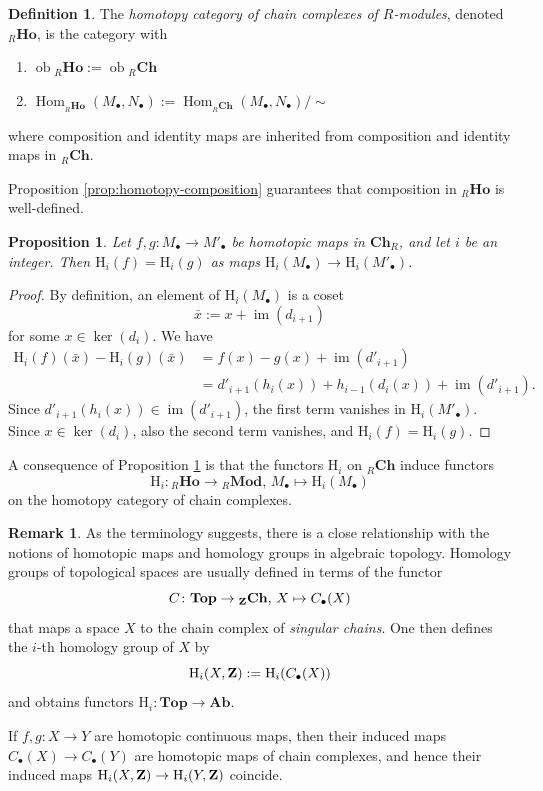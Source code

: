\documentclass[11pt]{amsbook}
\DeclareMathOperator\Hom{Hom}
\DeclareMathOperator\Mod{{\bf{Mod}}}
\DeclareMathOperator\im{im}
\DeclareMathOperator\ob{ob}
\def\rH{{\mathrm H}} \def\rK{{\mathrm K}} \def\rR{{\mathrm R}}
\def\Ab{\mathbf{Ab}}
\def\Top{\mathbf{Top}}
\def\Mod{\mathbf{Mod}}
\def\Ch{\mathbf{Ch}}
\def\Ho{\mathbf{Ho}}
\theoremstyle{plain}
\newtheorem{proposition}[theorem]{Proposition}
\theoremstyle{definition}
\newtheorem{definition}[theorem]{Definition}
\newtheorem{remark}[theorem]{Remark}
\begin{document}
\begin{definition}
The \emph{homotopy category of chain complexes of $R$-modules}, denoted ${}_R\Ho$,  is the
category with
\begin{enumerate}
\item $\ob {}_R\Ho := \ob {}_R\Ch$
\item $\Hom_{{}_R\Ho}(M_\bullet,N_\bullet) := \Hom_{{}_R\Ch}(M_\bullet, N_\bullet) / \sim$
\end{enumerate}
where composition and identity maps are inherited from composition and identity maps in ${}_R\Ch$.
\end{definition}

Proposition  \ref{prop:homotopy-composition} guarantees that composition in ${}_R\Ho$ is well-defined. 

\begin{proposition}\label{prop:homotopic-maps-agree-on-homology}
Let $f,g\colon M_\bullet \to M'_\bullet$ be homotopic maps in $\Ch_R$, and let $i$ be an integer. Then $\rH_i(f)=\rH_i(g)$ as maps $\rH_i(M_\bullet) \to \rH_i(M'_\bullet)$.
\end{proposition}

\begin{proof}
By definition, an element of $\rH_i(M_\bullet)$ is a coset
\[
	 \bar{x} := x + \im(d_{i+1})
\]
for some  $x\in \ker(d_i)$. We have
\begin{align*}
	\rH_i(f)(\bar{x}) - \rH_i(g)(\bar{x}) &=  f(x) - g(x) + \im (d'_{i+1})  \\
	&= d'_{i+1}(h_i(x)) + h_{i-1}(d_i(x))  +  \im (d'_{i+1}).
\end{align*}
Since $d'_{i+1}(h_i(x))  \in \im(d'_{i+1})$, the first term vanishes in $\rH_i(M'_\bullet)$. Since $x\in \ker(d_i)$, also the second term vanishes, and  $\rH_i(f)=\rH_i(g)$.
\end{proof}

A consequence of Proposition \ref{prop:homotopic-maps-agree-on-homology} is that the functors $\rH_i$ on ${}_R\Ch$ induce  functors
\[
	\rH_i\colon {}_R\Ho \to {}_R\Mod,\, M_\bullet \mapsto \rH_i(M_\bullet)
\]
on the homotopy category of chain complexes.

\begin{remark}As the terminology suggests, there is a close relationship with the notions of homotopic maps and homology groups in algebraic topology. Homology groups of topological spaces are usually defined in terms of the functor
\[
	C\colon \Top \to {}_\bZ\Ch,\, X \mapsto C_\bullet(X)
\]
that maps a space $X$ to the chain complex of \emph{singular chains}. One then defines the
$i$-th homology group of $X$ by
\[
	\rH_i(X,\bZ) := \rH_i(C_\bullet(X))
\]
and obtains functors $\rH_i\colon \Top \to \Ab$. 

If $f,g\colon X\to Y$ are homotopic continuous maps, then their induced maps $C_\bullet(X) \to C_\bullet(Y)$ are homotopic maps of chain complexes, and hence their induced maps $\rH_i(X,\bZ) \to \rH_i(Y,\bZ)$ coincide.
\end{remark}
\end{document}

